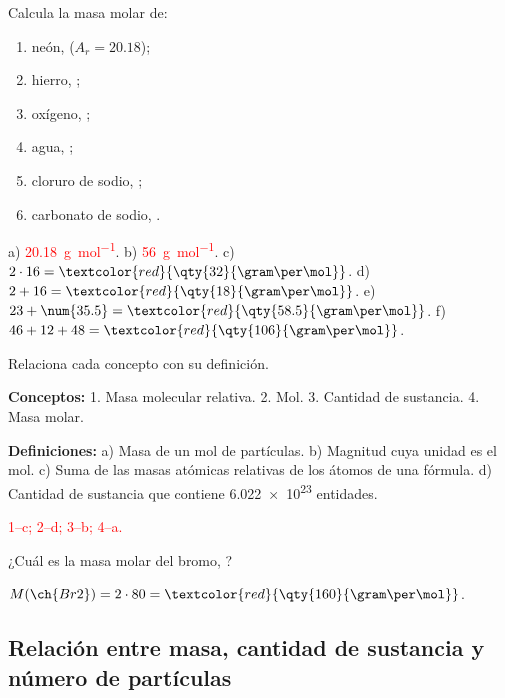 \begin{exercise}
    Calcula la masa molar de:
    \begin{enumerate}[label=\alph*)]
        \item neón,  (\(A_r = \num{20.18}\));
        \item hierro, ;
        \item oxígeno, ;
        \item agua, ;
        \item cloruro de sodio, ;
        \item carbonato de sodio, .
    \end{enumerate}
    \begin{solu}
        a) \textcolor{red}{\qty{20.18}{\gram\per\mol}}. b) \textcolor{red}{\qty{56}{\gram\per\mol}}. c) \(2 \cdot 16 = \textcolor{red}{\qty{32}{\gram\per\mol}}\). d) \(2 + 16 = \textcolor{red}{\qty{18}{\gram\per\mol}}\). e) \(23 + \num{35.5} = \textcolor{red}{\qty{58.5}{\gram\per\mol}}\). f) \(46 + 12 + 48 = \textcolor{red}{\qty{106}{\gram\per\mol}}\).
    \end{solu}
\end{exercise}

\begin{exercise}
    Relaciona cada concepto con su definición.

    \textbf{Conceptos:} 1. Masa molecular relativa. 2. Mol. 3. Cantidad de sustancia. 4. Masa molar.

    \textbf{Definiciones:} a) Masa de un mol de partículas. b) Magnitud cuya unidad es el mol. c) Suma de las masas atómicas relativas de los átomos de una fórmula. d) Cantidad de sustancia que contiene \num{6.022e23} entidades.
    \begin{solu}
        \textcolor{red}{1--c; 2--d; 3--b; 4--a.}
    \end{solu}
\end{exercise}

\begin{exercise}
    ¿Cuál es la masa molar del bromo, ?
    \begin{solu}
        \(M(\ch{Br2}) = 2 \cdot 80 = \textcolor{red}{\qty{160}{\gram\per\mol}}\).
    \end{solu}
\end{exercise}

\subsection{Relación entre masa, cantidad de sustancia y número de partículas}

